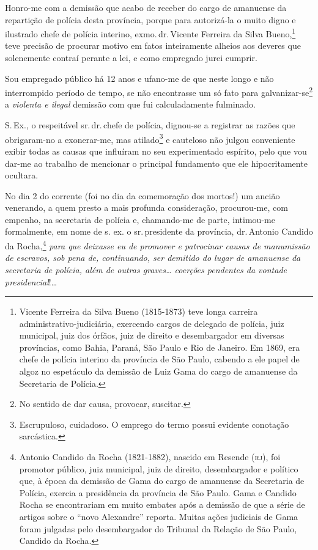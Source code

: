 Honro-me com a demissão que acabo de receber do cargo de amanuense da
repartição de polícia desta província, porque para autorizá-la o muito
digno e ilustrado chefe de polícia interino, exmo.\,dr.\,Vicente Ferreira
da Silva Bueno,\footnote{Vicente Ferreira da Silva Bueno (1815-1873)
  teve longa carreira administrativo-judiciária, exercendo cargos de
  delegado de polícia, juiz municipal, juiz dos órfãos, juiz de direito
  e desembargador em diversas províncias, como Bahia, Paraná, São Paulo
  e Rio de Janeiro. Em 1869, era chefe de polícia interino da província
  de São Paulo, cabendo a ele papel de algoz no espetáculo da demissão
  de Luiz Gama do cargo de amanuense da Secretaria de Polícia.} teve
precisão de procurar motivo em fatos inteiramente alheios aos deveres
que solenemente contraí perante a lei, e como empregado jurei cumprir.

Sou empregado público há 12 anos e ufano-me de que neste longo e não
interrompido período de tempo, se não encontrasse um só fato para
galvanizar-se\footnote{No sentido de dar causa, provocar, suscitar.} a
\emph{violenta e ilegal} demissão com que fui calculadamente fulminado.

S.\,Ex., o respeitável sr.\,dr.\,chefe de polícia, dignou-se a registrar as
razões que obrigaram-no a exonerar-me, mas atilado\footnote{
  Escrupuloso, cuidadoso. O emprego do termo possui evidente conotação
  sarcástica.} e cauteloso não julgou conveniente exibir todas as causas
que influíram no seu experimentado espírito, pelo que vou dar-me ao
trabalho de mencionar o principal fundamento que ele hipocritamente
ocultara.

No dia 2 do corrente (foi no dia da comemoração dos mortos!) um ancião
venerando, a quem presto a mais profunda consideração, procurou-me, com
empenho, na secretaria de polícia e, chamando-me de parte, intimou-me
formalmente, em nome de s. ex. o sr.\,presidente da província, dr.\,Antonio Candido da Rocha,\footnote{Antonio Candido da Rocha
  (1821-1882), nascido em Resende (\textsc{rj}), foi promotor público, juiz
  municipal, juiz de direito, desembargador e político que, à época da
  demissão de Gama do cargo de amanuense da Secretaria de Polícia,
  exercia a presidência da província de São Paulo. Gama e Candido Rocha
  se encontrariam em muito embates após a demissão de que a série de
  artigos sobre o ``novo Alexandre'' reporta. Muitas ações judiciais de
  Gama foram julgadas pelo desembargador do Tribunal da Relação de São
  Paulo, Candido da Rocha.} \emph{para que deixasse eu de promover e
patrocinar causas de manumissão de escravos, sob pena de, continuando,
ser demitido do lugar de amanuense da secretaria de polícia, além de
outras graves\ldots{} coerções pendentes da vontade presidencial}!\ldots{}

